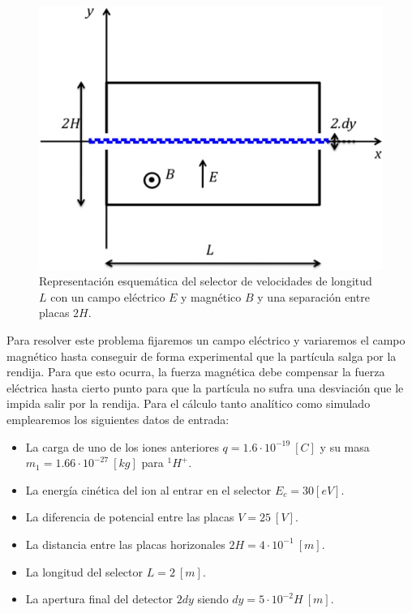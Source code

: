 \documentclass[journal]{IEEEtran}
\begin{document}
\begin{figure}[!htb]
    \includegraphics[width=\linewidth]{selector.png}
    \caption{Representación esquemática del selector de velocidades de longitud $L$ con un campo eléctrico $E$ y magnético $B$ y una separación entre placas $2H$.}
    \label{fig:selector}
\end{figure}

Para resolver este problema fijaremos un campo eléctrico y variaremos el campo magnético hasta conseguir de forma experimental que la partícula salga por la rendija. Para que esto ocurra, la fuerza magnética debe compensar la fuerza eléctrica hasta cierto punto para que la partícula no sufra una desviación que le impida salir por la rendija. Para el cálculo tanto analítico como simulado emplearemos los siguientes datos de entrada:

\begin{itemize}
    \item La carga de uno de los iones anteriores $q = 1.6\cdot10^{-19}~[C]$ y su masa $m_1 = 1.66\cdot10^{-27}~[kg]$ para $^1H^+$.
    \item La energía cinética del ion al entrar en el selector $E_c = 30 [eV]$.
    \item La diferencia de potencial entre las placas $V = 25~[V]$.
    \item La distancia entre las placas horizonales $2H = 4\cdot 10^{-1}~[m]$.
    \item La longitud del selector $L = 2~[m]$.
    \item La apertura final del detector $2dy$ siendo $dy = 5\cdot10^{-2}H~[m]$.
\end{itemize}
\end{document}
